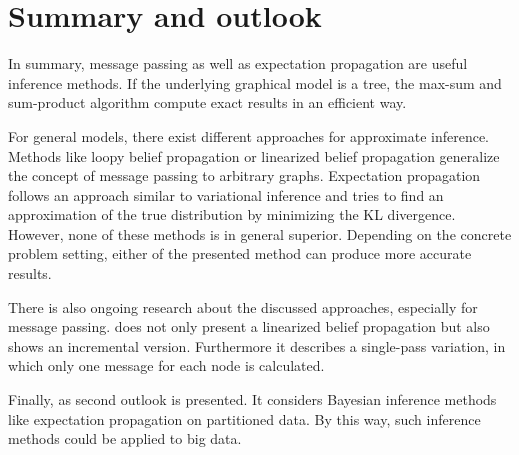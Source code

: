 \documentclass{sigkdd}
\begin{document}
\section{Summary and outlook}
In summary, message passing as well as expectation propagation are useful inference methods. If the underlying graphical model is a tree, the max-sum and sum-product algorithm compute exact results in an efficient way.

For general models, there exist different approaches for approximate inference. Methods like loopy belief propagation or linearized belief propagation generalize the concept of message passing to arbitrary graphs. Expectation propagation follows an approach similar to variational inference and tries to find an approximation of the true distribution by minimizing the KL divergence.
However, none of these methods is in general superior. Depending on the concrete problem setting, either of the presented method can produce more accurate results.

There is also ongoing research about the discussed approaches, especially for message passing. \cite{Gatterbauer:2015:LSB:2735479.2735490} does not only present a linearized belief propagation but also shows an incremental version. Furthermore it describes a single-pass variation, in which only one message for each node is calculated.

Finally, as second outlook \cite{wayoflife} is presented. It considers Bayesian inference methods like expectation propagation on partitioned data. By this way, such inference methods could be applied to big data.




\nocite{*}
\end{document}
